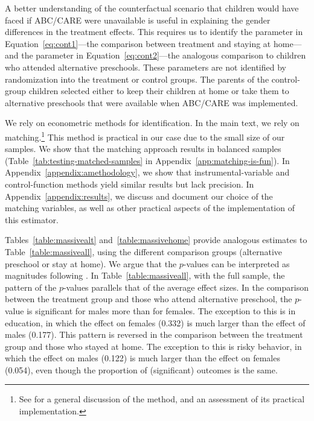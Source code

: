 
A better understanding of the counterfactual scenario that children would have faced if ABC/CARE were unavailable is useful in explaining the gender differences in the treatment effects. This requires us to identify the parameter in Equation~\eqref{eq:cont1}---the comparison between treatment and staying at home---and the parameter in Equation~\eqref{eq:cont2}---the analogous comparison to children who attended alternative preschools. These parameters are not identified by randomization into the treatment or control groups. The parents of the control-group children selected either to keep their children at home or take them to alternative preschools that were available when ABC/CARE was implemented. 

We rely on econometric methods for identification. In the main text, we rely on matching.\footnote{See \citet{Heckman_Ichimura_etal_1998_REStud} for a general discussion of the method, and an assessment of its practical implementation.} This method is practical in our case due to the small size of our samples. We show that the matching approach results in balanced samples (Table~\ref{tab:testing-matched-samples} in Appendix~\ref{app:matching-is-fun}). In Appendix~\ref{appendix:amethodology}, we show that instrumental-variable and control-function methods yield similar results but lack precision. In Appendix~\ref{appendix:results}, we discuss and document our choice of the matching variables, as well as other practical aspects of the implementation of this estimator.

Tables~\ref{table:massivealt} and~\ref{table:massivehome} provide analogous estimates to Table~\ref{table:massiveall}, using the different comparison groups (alternative preschool or stay at home). We argue that the $p$-values can be interpreted as magnitudes following \citet{Fisher_1935_Inference_JRSS}. In Table~\ref{table:massiveall}, with the full sample, the pattern of the $p$-values parallels that of the average effect sizes. In the comparison between the treatment group and those who attend alternative preschool, the  \citet{Rosenbaum_2005_Distribution_JRSS} $p$-value is significant for males more than for females. The exception to this is in education, in which the effect on females (0.332) is much larger than the effect of males (0.177). This pattern is reversed in the comparison between the treatment group and those who stayed at home. The exception to this is risky behavior, in which the effect on males (0.122) is much larger than the effect on females (0.054), even though the proportion of (significant) outcomes is the same. 

